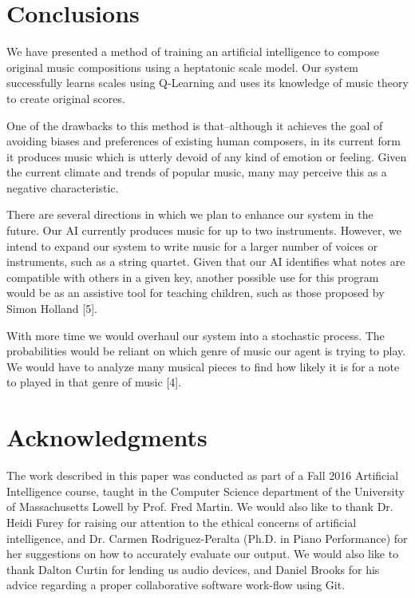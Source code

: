 \documentclass{chi2009}
\begin{document}
\section{Conclusions}

We have presented a method of training an artificial intelligence to compose original music compositions using a heptatonic scale model.  Our system successfully learns scales using Q-Learning and uses its knowledge of music theory to create original scores.

One of the drawbacks to this method is that--although it achieves the goal of avoiding biases and preferences of existing human composers, in its current form it produces music which is utterly devoid of any kind of emotion or feeling.  Given the current climate and trends of popular music, many may perceive this as a negative characteristic.

There are several directions in which we plan to enhance our system in the future.  Our AI currently produces music for up to two instruments.  However, we intend to expand our system to write music for a larger number of voices or instruments, such as a string quartet.  Given that our AI identifies what notes are compatible with others in a given key, another possible use for this program would be as an assistive tool for teaching children, such as those proposed by Simon Holland [5].

With more time we would overhaul our system into a stochastic process. The probabilities would be reliant on which genre of music our agent is trying to play. We would have to analyze many musical pieces to find how likely it is for a note to played in that genre of music [4]. 
\section{Acknowledgments}

The work described in this paper was conducted as part of a Fall 2016 Artificial Intelligence course, taught in the Computer Science department of the University of Massachusetts Lowell by Prof. Fred Martin.  We would also like to thank Dr. Heidi Furey for raising our attention to the ethical concerns of artificial intelligence, and Dr. Carmen Rodriguez-Peralta (Ph.D. in Piano Performance) for her suggestions on how to accurately evaluate our output.  We would also like to thank Dalton Curtin for lending us audio devices, and Daniel Brooks for his advice regarding a proper collaborative software work-flow using Git.
\end{document}
